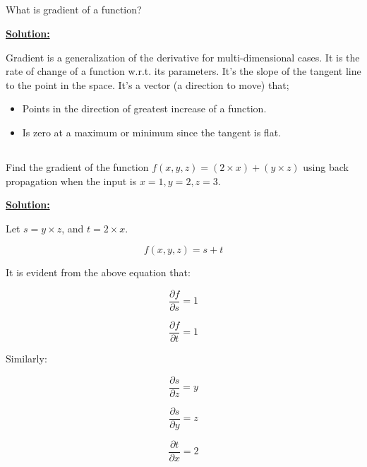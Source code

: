 \documentclass[a4paper,10pt]{article}
\begin{document}
\subsection{}
What is gradient of a function?

\textbf{\underline{Solution:}} 

Gradient is a generalization of the derivative for multi-dimensional cases. It is the rate of change of a function w.r.t. its parameters. It's the slope of the tangent line to the point in the space. It’s a vector (a direction to move) that;
\begin{itemize}
\item Points in the direction of greatest increase of a function.
\item Is zero at a maximum or minimum since the tangent is flat.
\end{itemize}

\subsection{}
Find the gradient of the function $f(x, y, z) = (2 \times x) + (y \times z)$ using back propagation when the input is $x = 1, y = 2, z = 3$.

\textbf{\underline{Solution:}} 

Let $s=y \times z$, and $t=2 \times x$.

\begin{equation}
f(x, y, z) = s + t
\end{equation}

It is evident from the above equation that:

\begin{equation}
\frac{\partial f}{\partial s} = 1
\end{equation}

\begin{equation}
\frac{\partial f}{\partial t} = 1
\end{equation}

Similarly:

\begin{equation}
\frac{\partial s}{\partial z} = y
\end{equation}

\begin{equation}
\frac{\partial s}{\partial y} = z
\end{equation}

\begin{equation}
\frac{\partial t}{\partial x} = 2
\end{equation}
\end{document}
